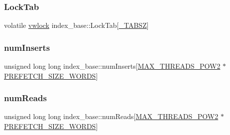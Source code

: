 \mbox{\label{classindex__base_ab017238f575199c45f558d878f949635}} 
\subsubsection{\texorpdfstring{Lock\+Tab}{LockTab}}
{\footnotesize\ttfamily volatile \hyperlink{index__base_8h_a83d2222c5a48984baf95b9d9c50b23dc}{vwlock} index\+\_\+base\+::\+Lock\+Tab\mbox{[}\hyperlink{index__base_8h_aaad4f00f49f1549864c4e86f2e2d38c8}{\+\_\+\+T\+A\+B\+SZ}\mbox{]}\hspace{0.3cm}{\ttfamily [protected]}}

\mbox{\label{classindex__base_a174339e599ecc8f223744c01ebeef0d3}} 
\subsubsection{\texorpdfstring{num\+Inserts}{numInserts}}
{\footnotesize\ttfamily unsigned long long index\+\_\+base\+::num\+Inserts\mbox{[}\hyperlink{plaf_8h_ac1585a3455dd3e33e877e588be9e466b}{M\+A\+X\+\_\+\+T\+H\+R\+E\+A\+D\+S\+\_\+\+P\+O\+W2} $\ast$\hyperlink{plaf_8h_af55592679e3b40dd3c45ec6faef1b053}{P\+R\+E\+F\+E\+T\+C\+H\+\_\+\+S\+I\+Z\+E\+\_\+\+W\+O\+R\+DS}\mbox{]}\hspace{0.3cm}{\ttfamily [protected]}}

\mbox{\label{classindex__base_ac947600e88bf99120d4a2bfb7e3be395}} 
\subsubsection{\texorpdfstring{num\+Reads}{numReads}}
{\footnotesize\ttfamily unsigned long long index\+\_\+base\+::num\+Reads\mbox{[}\hyperlink{plaf_8h_ac1585a3455dd3e33e877e588be9e466b}{M\+A\+X\+\_\+\+T\+H\+R\+E\+A\+D\+S\+\_\+\+P\+O\+W2} $\ast$\hyperlink{plaf_8h_af55592679e3b40dd3c45ec6faef1b053}{P\+R\+E\+F\+E\+T\+C\+H\+\_\+\+S\+I\+Z\+E\+\_\+\+W\+O\+R\+DS}\mbox{]}\hspace{0.3cm}{\ttfamily [protected]}}

